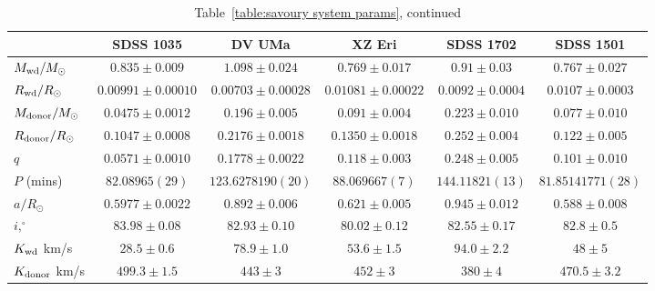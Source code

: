 \begin{landscape}
        \begin{table}
            \caption{Table~\ref{table:savoury system params}, continued}
            \label{table:savoury system params cont 1}
            \begin{tabular}{lccccc}
                \hline
                ~                           & {\bf SDSS 1035}       & {\bf DV UMa}          & {\bf XZ Eri}          & {\bf SDSS 1702}       & {\bf SDSS 1501}       \\
                \hline
                \hline
                $M_{\rm wd}/M_{\odot}$      & $0.835\pm0.009$       & $1.098\pm0.024$       & $0.769\pm0.017$       & $0.91\pm0.03$         & $0.767\pm0.027$       \\
                $R_{\rm wd}/R_{\odot}$      & $0.00991\pm0.00010$   & $0.00703\pm0.00028$   & $0.01081\pm0.00022$   & $0.0092\pm0.0004$     & $0.0107\pm0.0003$     \\
                $M_{\rm donor}/M_{\odot}$   & $0.0475\pm0.0012$     & $0.196\pm0.005$       & $0.091\pm0.004$       & $0.223\pm0.010$       & $0.077\pm0.010$       \\
                $R_{\rm donor}/R_{\odot}$   & $0.1047\pm0.0008$     & $0.2176\pm0.0018$     & $0.1350\pm0.0018$     & $0.252\pm0.004$       & $0.122\pm0.005$       \\
                $q$                         & $0.0571\pm0.0010$     & $0.1778\pm0.0022$     & $0.118\pm0.003$       & $0.248\pm0.005$       & $0.101\pm0.010$       \\
                \hline
                $P$ (mins)                  & $82.08965(29)$        & $123.6278190(20)$     & $88.069667(7)$        & $144.11821(13)$       & $81.85141771(28)$     \\
                $a/R_{\odot}$               & $0.5977\pm0.0022$     & $0.892\pm0.006$       & $0.621\pm0.005$       & $0.945\pm0.012$       & $0.588\pm0.008$       \\
                $i, ^\circ$                 & $83.98\pm0.08$        & $82.93\pm0.10$        & $80.02\pm0.12$        & $82.55\pm0.17$        & $82.8\pm0.5$          \\
                $K_{\rm wd}$ km/s           & $28.5\pm0.6$          & $78.9\pm1.0$          & $53.6\pm1.5$          & $94.0\pm2.2$          & $48\pm5$              \\
                $K_{\rm donor}$ km/s        & $499.3\pm1.5$         & $443\pm3$             & $452\pm3$             & $380\pm4$             & $470.5\pm3.2$         \\

\end{tabular}
\end{table}
\end{landscape}
